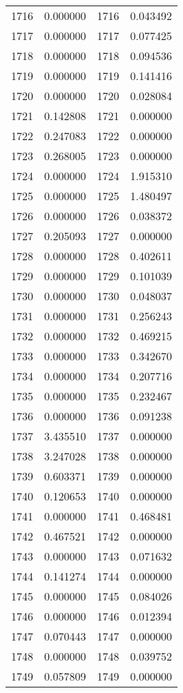 \documentclass[12pt]{article}
\begin{document}
\begin{longtable}{@{}cccc@{}}
1716 & 0.000000 & 1716 & 0.043492 \\
1717 & 0.000000 & 1717 & 0.077425 \\
1718 & 0.000000 & 1718 & 0.094536 \\
1719 & 0.000000 & 1719 & 0.141416 \\
1720 & 0.000000 & 1720 & 0.028084 \\
1721 & 0.142808 & 1721 & 0.000000 \\
1722 & 0.247083 & 1722 & 0.000000 \\
1723 & 0.268005 & 1723 & 0.000000 \\
1724 & 0.000000 & 1724 & 1.915310 \\
1725 & 0.000000 & 1725 & 1.480497 \\
1726 & 0.000000 & 1726 & 0.038372 \\
1727 & 0.205093 & 1727 & 0.000000 \\
1728 & 0.000000 & 1728 & 0.402611 \\
1729 & 0.000000 & 1729 & 0.101039 \\
1730 & 0.000000 & 1730 & 0.048037 \\
1731 & 0.000000 & 1731 & 0.256243 \\
1732 & 0.000000 & 1732 & 0.469215 \\
1733 & 0.000000 & 1733 & 0.342670 \\
1734 & 0.000000 & 1734 & 0.207716 \\
1735 & 0.000000 & 1735 & 0.232467 \\
1736 & 0.000000 & 1736 & 0.091238 \\
1737 & 3.435510 & 1737 & 0.000000 \\
1738 & 3.247028 & 1738 & 0.000000 \\
1739 & 0.603371 & 1739 & 0.000000 \\
1740 & 0.120653 & 1740 & 0.000000 \\
1741 & 0.000000 & 1741 & 0.468481 \\
1742 & 0.467521 & 1742 & 0.000000 \\
1743 & 0.000000 & 1743 & 0.071632 \\
1744 & 0.141274 & 1744 & 0.000000 \\
1745 & 0.000000 & 1745 & 0.084026 \\
1746 & 0.000000 & 1746 & 0.012394 \\
1747 & 0.070443 & 1747 & 0.000000 \\
1748 & 0.000000 & 1748 & 0.039752 \\
1749 & 0.057809 & 1749 & 0.000000 \\

\end{longtable}
\end{document}
